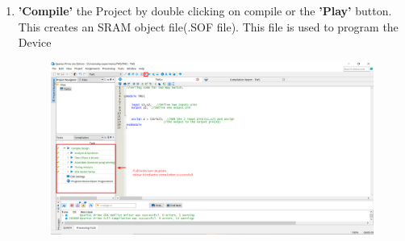 \documentclass[12pt]{article}
\begin{document}
 \begin{enumerate}
     \item \textbf{'Compile'} the Project by double clicking on compile or the \textbf{'Play'} button. This creates an SRAM object file(.SOF file). This file is used to program the Device
     \begin{figure}[H]
         \centering
         \includegraphics[scale=0.32]{twsd1.png}
     \end{figure}
     

\end{enumerate}
\end{document}
